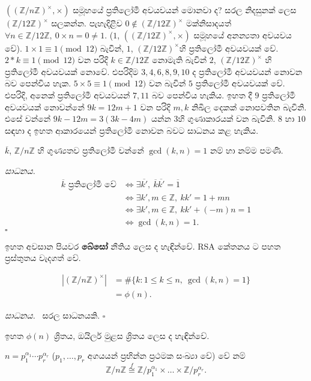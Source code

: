 \documentclass[10pt]{book}
\newenvironment{proof}[1][සාධනය]{%
  \par\noindent\textsl{#1.}\ }%
  {\hfill$\square$\par}%
\begin{document}
\begin{example}
$((\mathbb{Z}/n\mathbb{Z})^\times, \times)$ සමූහයේ ප්‍රතිලෝමී අවයවයන් මොනවා ද? සරල නිදසුනක් ලෙස $(\mathbb{Z}/12\mathbb{Z})^\times$ සලකන්න. පැහැදිළිව $0 \notin (\mathbb{Z}/12\mathbb{Z})^\times$ මක්නිසාදයත් $\forall n \in \mathbb{Z}/12\mathbb{Z},\ 0 \times n = 0 \neq 1$. ($1$, $((\mathbb{Z}/12\mathbb{Z})^\times, \times)$ සමූහයේ අනන්‍යතා අවයවය වේ). $1\times1 \equiv 1 \pmod{12}$ බැවින්, $1$, $(\mathbb{Z}/12\mathbb{Z})^\times$හි ප්‍රතිලෝමී අවයවයක් වේ. $2 * k \equiv 1 \pmod{12}$ වන පරිදි $k \in \mathbb{Z}/12\mathbb{Z}$ නොමැති බැවින් $2$, $(\mathbb{Z}/12\mathbb{Z})^\times$ හි ප්‍රතිලෝමී අවයවයක් නොවේ. එපරිදිම $3, 4, 6, 8, 9, 10$ ද ප්‍රතිලෝමී අවයවයන් නොවන බව පෙන්විය හැක. $5\times5 \equiv 1\pmod{12}$ වන බැවින් $5$ ප්‍රතිලෝමී අවයවයක් වේ. එපරිදි, අනෙක් ප්‍රතිලෝමී අවයවයන් $7, 11$ බව පෙන්විය හැකිය. ඉහත දී $9$ ප්‍රතිලෝමී අවයවයක් නොවන්නේ $9k = 12m + 1$ වන පරිදි $m, k$ නිඛිල දෙකක් නොපවතින බැවිනි. එසේ වන්නේ $9k - 12m = 3(3k - 4m)$ යන්න $3$හි ගුණාකාරයක් වන බැවිනි. $8$ හා $10$ සඳහා ද ඉහත ආකාරයෙන් ප්‍රතිලෝමී නොවන බවට සාධනය කළ හැකිය.
\end{example}

\begin{proposition}
$\overline{k}$, $\mathbb{Z}/n\mathbb{Z}$ හි ගුණ්‍යතව ප්‍රතිලෝමී වන්නේ $\gcd(k, n) = 1$ නම් හා නම්ම පමණි.
\end{proposition}
\begin{proof}
\begin{align*}
\overline{k} \text{ ප්‍රතිලෝමී වේ} &\Leftrightarrow \exists \overline{k'},\ \overline{k}\overline{k'} = \overline{1}\\
&\Leftrightarrow \exists k', m \in \mathbb{Z},\ kk' = 1 + mn\\
&\Leftrightarrow \exists k', m \in \mathbb{Z},\ kk' + (-m)n = 1\\
&\Leftrightarrow \gcd(k, n) = 1.
\end{align*}
\end{proof}
ඉ​​හත අ​වසාන පිය​වර​​ \textbf{බේ​සෝ} නීතිය ලෙ​​ස ද හැඳින්වේ.
RSA කේ​තන​​ය ට ප​හත ප්‍රස්තුත​​ය වැද​ගත් වේ.
\begin{proposition}
\begin{align*}
|(\mathbb{Z}/n\mathbb{Z})^\times| &= \#\{k:1\le k \le n,\ \gcd(k, n) = 1\}\\
                                  &= \phi(n).
\end{align*}
\end{proposition}
\begin{proof}
ස​රල සාධ​නය​​කි.
\end{proof}
ඉ​හත $\phi(n)$ ශ්‍රිත​​ය, ඔ​​යිල​​ර් මුළ​​ස ශ්‍රිත​​ය ලෙ​​ස ද හැඳින්වේ.

\begin{theorem}[{}චීන ශේ​​ෂ ප්‍රමේ​යය-{}චීශේෂ]
$n = p_1^{\alpha_1}\cdots p_r^{\alpha_r}$ ($p_1, \ldots, p_r$ අ​ගය​යන් ප්‍රභින්න ප්‍රථ​මක සංඛ්‍යා වේ) වේ න​​ම් 
\[
\mathbb{Z}/n\mathbb{Z} \overset{f}{\cong} \mathbb{Z}/p_1^{\alpha_1}\times\ldots\times\mathbb{Z}/p_r^{\alpha_r}.
\]
\end{theorem}
\end{document}
